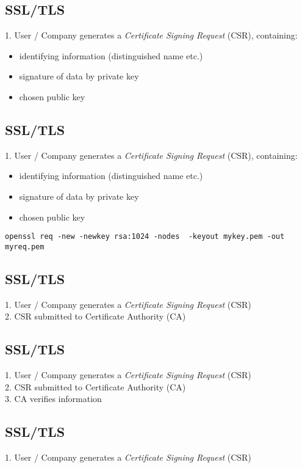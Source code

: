 \documentclass[xga]{xdvislides}
\begin{document}
\subsection{SSL/TLS}
1. User / Company generates a {\em Certificate Signing Request} (CSR),
containing:

\begin{itemize}
	\item identifying information (distinguished name etc.)
	\item signature of data by private key
	\item chosen public key
\end{itemize}


\subsection{SSL/TLS}
1. User / Company generates a {\em Certificate Signing Request} (CSR),
containing:

\begin{itemize}
	\item identifying information (distinguished name etc.)
	\item signature of data by private key
	\item chosen public key
\end{itemize}

{\tt openssl req -new -newkey rsa:1024 -nodes \
  -keyout mykey.pem -out myreq.pem}

\subsection{SSL/TLS}
1. User / Company generates a {\em Certificate Signing Request} (CSR) \\

2. CSR submitted to Certificate Authority (CA) \\

\subsection{SSL/TLS}
1. User / Company generates a {\em Certificate Signing Request} (CSR) \\

2. CSR submitted to Certificate Authority (CA) \\

3. CA verifies information \\

\subsection{SSL/TLS}
1. User / Company generates a {\em Certificate Signing Request} (CSR) \\
\end{document}
